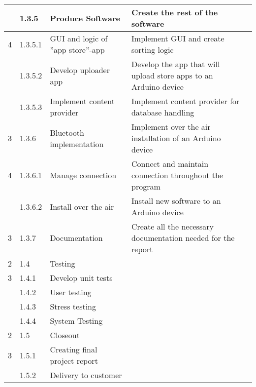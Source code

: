 \begin{longtable}{|m{}|m{}|m{}|m{}|m{}|}
\hline
	 & 1.3.5 & Produce Software & Create the rest of the software & \\
\hline
	4 & 1.3.5.1 & GUI and logic of ''app store''-app & Implement GUI and create sorting logic & \\
\hline
	 & 1.3.5.2 & Develop uploader app & Develop the app that will upload store apps to an Arduino device & \\
\hline
	 & 1.3.5.3 & Implement content provider & Implement content provider for database handling & \\
\hline
	3 & 1.3.6 & Bluetooth implementation & Implement over the air installation of an Arduino device & \\
\hline
	4 & 1.3.6.1 & Manage connection & Connect and maintain connection throughout the program & \\
\hline
	 & 1.3.6.2 & Install over the air & Install new software to an Arduino device & \\
\hline
	3 & 1.3.7 & Documentation & Create all the necessary documentation needed for the report & \\
\hline
	2 & 1.4 & Testing & & \\
\hline
	3 & 1.4.1 & Develop unit tests & & \\
\hline
	 & 1.4.2 & User testing & & \\
\hline
	 & 1.4.3 & Stress testing & & \\
\hline
	 & 1.4.4 & System Testing & & \\
\hline
	2 & 1.5 & Closeout & & \\
\hline
	3 & 1.5.1 & Creating final project report & & \\
\hline
	 & 1.5.2 & Delivery to customer & & \\
\hline
\end{longtable}
